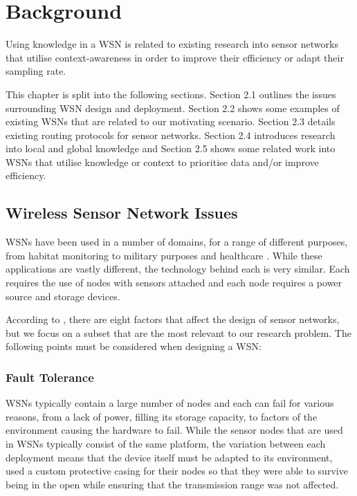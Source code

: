 \chapter{Background}
Using knowledge in a WSN is related to existing research into sensor networks that utilise context-awareness in order to improve their efficiency or adapt their sampling rate. 

This chapter is split into the following sections. Section 2.1 outlines the issues surrounding WSN design and deployment. Section 2.2 shows some examples of existing WSNs that are related to our motivating scenario. Section 2.3 details existing routing protocols for sensor networks. Section 2.4 introduces research into local and global knowledge and Section 2.5  shows some related work into WSNs that utilise knowledge or context to prioritise data and/or improve efficiency.

\section{Wireless Sensor Network Issues}

WSNs have been used in a number of domains, for a range of different purposes, from habitat monitoring \cite{Szewczyk2004a} to military purposes \cite{Pizzocaro} and healthcare \cite{Otto2006}. While these applications are vastly different, the technology behind each is very similar. Each requires the use of nodes with sensors attached and each node requires a power source and storage devices.

According to \cite{Akyildiz2002}, there are eight factors that affect the design of sensor networks, but we focus on a subset that are the most relevant to our research problem. The following points must be considered when designing a WSN:

\subsection{Fault Tolerance}
	WSNs typically contain a large number of nodes and each can fail for various reasons, from a lack of power, filling its storage capacity, to factors of the environment causing the hardware to fail. While the sensor nodes that are used in WSNs typically consist of the same platform, the variation between each deployment means that the device itself must be adapted to its environment, \cite{Mainwaring2002} used a custom protective casing for their nodes so that they were able to survive being in the open while ensuring that the transmission range was not affected.

